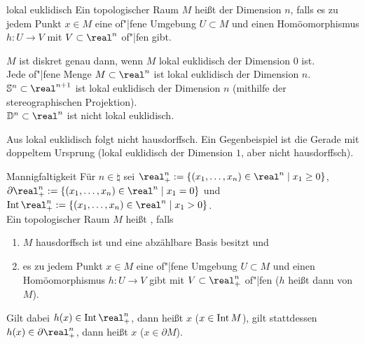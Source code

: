 \begin{Def}{lokal euklidisch}
    Ein topologischer Raum $M$ heißt  der
    Dimension $n$, falls es zu jedem Punkt $x \in M$ eine of"|fene Umgebung
    $U \subset M$ und einen Homöomorphismus $h\colon U \rightarrow V$
    mit $V \subset \real^n$ of"|fen gibt.
\end{Def}

\begin{Bsp}
    $M$ ist diskret genau dann, wenn $M$ lokal euklidisch der Dimension $0$
    ist. \\
    Jede of"|fene Menge $M \subset \real^n$ ist lokal euklidisch der
    Dimension $n$. \\
    $\sphere^n \subset \real^{n+1}$ ist lokal euklidisch der Dimension $n$
    (mithilfe der stereographischen Projektion). \\
    $\dball^n \subset \real^n$ ist nicht lokal euklidisch.
\end{Bsp}

\begin{Bem}
    Aus lokal euklidisch folgt nicht hausdorffsch.
    Ein Gegenbeispiel ist die Gerade mit doppeltem Ursprung
    (lokal euklidisch der Dimension $1$, aber nicht hausdorffsch).
\end{Bem}

\linie

\begin{Def}{Mannigfaltigkeit}
    Für $n \in \natural$ sei
    $\real^n_+ := \{(x_1, \dotsc, x_n) \in \real^n \;|\; x_1 \ge 0\}$, \\
    $\partial \real^n_+ := \{(x_1, \dotsc, x_n) \in \real^n \;|\; x_1 = 0\}$
    und $\Int \real^n_+ := \{(x_1, \dotsc, x_n) \in \real^n
    \;|\; x_1 > 0\}$. \\
    Ein topologischer Raum $M$ heißt , falls
    \begin{enumerate}
        \item
        $M$ hausdorffsch ist und eine abzählbare Basis besitzt und

        \item
        es zu jedem Punkt $x \in M$ eine of"|fene Umgebung $U \subset M$ und
        einen Homöomorphismus $h\colon U \rightarrow V$ gibt mit
        $V \subset \real^n_+$ of"|fen
        ($h$ heißt dann  von $M$).
    \end{enumerate}
    Gilt dabei $h(x) \in \Int \real^n_+$,
    dann heißt $x$  ($x \in \operatorname{Int} M$),
    gilt stattdessen $h(x) \in \partial \real^n_+$,
    dann heißt $x$  ($x \in \partial M$).
\end{Def}

